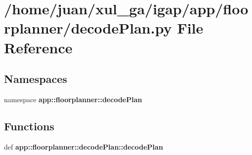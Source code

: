 \section{/home/juan/xul\_\-ga/igap/app/floorplanner/decodePlan.py File Reference}
\label{decodePlan_8py}
\subsection*{Namespaces}
\begin{CompactItemize}
\item 
namespace {\bf app::floorplanner::decodePlan}
\end{CompactItemize}
\subsection*{Functions}
\begin{CompactItemize}
\item 
def {\bf app::floorplanner::decodePlan::decodePlan}
\end{CompactItemize}
